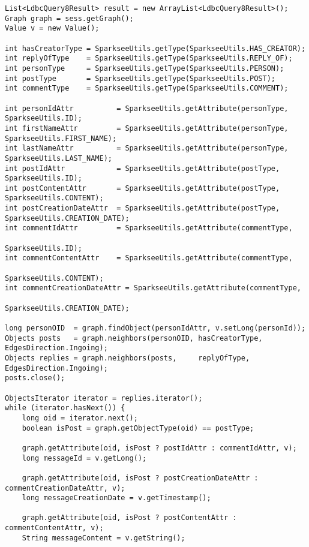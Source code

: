 {\footnotesize
\begin{verbatim}
List<LdbcQuery8Result> result = new ArrayList<LdbcQuery8Result>();
Graph graph = sess.getGraph();
Value v = new Value();

int hasCreatorType = SparkseeUtils.getType(SparkseeUtils.HAS_CREATOR);
int replyOfType    = SparkseeUtils.getType(SparkseeUtils.REPLY_OF);
int personType     = SparkseeUtils.getType(SparkseeUtils.PERSON);
int postType       = SparkseeUtils.getType(SparkseeUtils.POST);
int commentType    = SparkseeUtils.getType(SparkseeUtils.COMMENT);

int personIdAttr          = SparkseeUtils.getAttribute(personType, SparkseeUtils.ID);
int firstNameAttr         = SparkseeUtils.getAttribute(personType, SparkseeUtils.FIRST_NAME);
int lastNameAttr          = SparkseeUtils.getAttribute(personType, SparkseeUtils.LAST_NAME);
int postIdAttr            = SparkseeUtils.getAttribute(postType, SparkseeUtils.ID);
int postContentAttr       = SparkseeUtils.getAttribute(postType, SparkseeUtils.CONTENT);
int postCreationDateAttr  = SparkseeUtils.getAttribute(postType, SparkseeUtils.CREATION_DATE);
int commentIdAttr         = SparkseeUtils.getAttribute(commentType, 
                                                       SparkseeUtils.ID);
int commentContentAttr    = SparkseeUtils.getAttribute(commentType, 
                                                       SparkseeUtils.CONTENT);
int commentCreationDateAttr = SparkseeUtils.getAttribute(commentType, 
                                                         SparkseeUtils.CREATION_DATE);

long personOID  = graph.findObject(personIdAttr, v.setLong(personId));
Objects posts   = graph.neighbors(personOID, hasCreatorType, EdgesDirection.Ingoing);
Objects replies = graph.neighbors(posts,     replyOfType,    EdgesDirection.Ingoing);
posts.close();

ObjectsIterator iterator = replies.iterator();
while (iterator.hasNext()) {
    long oid = iterator.next();
    boolean isPost = graph.getObjectType(oid) == postType;

    graph.getAttribute(oid, isPost ? postIdAttr : commentIdAttr, v);
    long messageId = v.getLong();

    graph.getAttribute(oid, isPost ? postCreationDateAttr : commentCreationDateAttr, v);
    long messageCreationDate = v.getTimestamp();

    graph.getAttribute(oid, isPost ? postContentAttr : commentContentAttr, v);
    String messageContent = v.getString();


\end{verbatim}}
